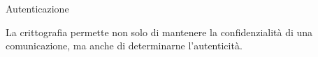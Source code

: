 \capitolo Autenticazione

La crittografia permette non solo di mantenere la confidenzialit\`a di una
comunicazione, ma anche di determinarne l'autenticit\`a.
